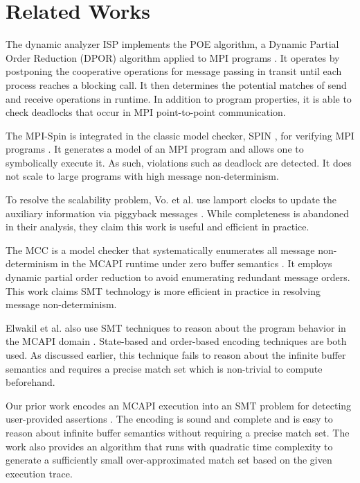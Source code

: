 \section{Related Works}
The dynamic analyzer ISP implements the POE algorithm, a Dynamic Partial Order Reduction (DPOR) algorithm \cite{DBLP:conf/popl/FlanaganG05} applied to MPI programs \cite{DBLP:conf/ppopp/VakkalankaSGK08}. It operates by postponing the cooperative operations for message passing in transit until each process reaches a blocking call. It then determines the potential matches of send and receive operations in runtime. In addition to program properties, it is able to check deadlocks that occur in MPI point-to-point communication.

The MPI-Spin is integrated in the classic model checker, SPIN \cite{DBLP:journals/tse/Holzmann97}, for verifying MPI programs \cite{DBLP:conf/vmcai/Siegel07, DBLP:conf/pvm/Siegel07}. It generates a model of an MPI program and allows one to symbolically execute it. As such, violations such as deadlock are detected. It does not scale to large programs with high message non-determinism.

To resolve the scalability problem, Vo. et al. use lamport clocks to update the auxiliary information via piggyback messages \cite{DBLP:conf/sc/VoAGSSB10, DBLP:conf/IEEEpact/VoGKSSB11}. While completeness is abandoned in their analysis, they claim this work is useful and efficient in practice. 

The MCC is a model checker that systematically enumerates all message non-determinism in the MCAPI runtime under zero buffer semantics \cite{DBLP:conf/fmcad/SharmaGMH09}. It employs dynamic partial order reduction to avoid enumerating redundant message orders. This work claims SMT technology is more efficient in practice in resolving message non-determinism. 

Elwakil et al. also use SMT techniques to reason about the program behavior in the MCAPI domain \cite{DBLP:conf/issta/ElwakilY10, DBLP:conf/atva/ElwakilYW10}. State-based and order-based encoding techniques are both used. As discussed earlier, this technique fails to reason about the infinite buffer semantics and requires a precise match set which is non-trivial to compute beforehand.

Our prior work encodes an MCAPI execution into an SMT problem for detecting user-provided assertions \cite{DBLP:conf/kbse/HuangMM13}. The encoding is sound and complete and is easy to reason about infinite buffer semantics without requiring a precise match set. The work also provides an algorithm that runs with quadratic time complexity to generate a sufficiently small over-approximated match set based on the given execution trace. 

